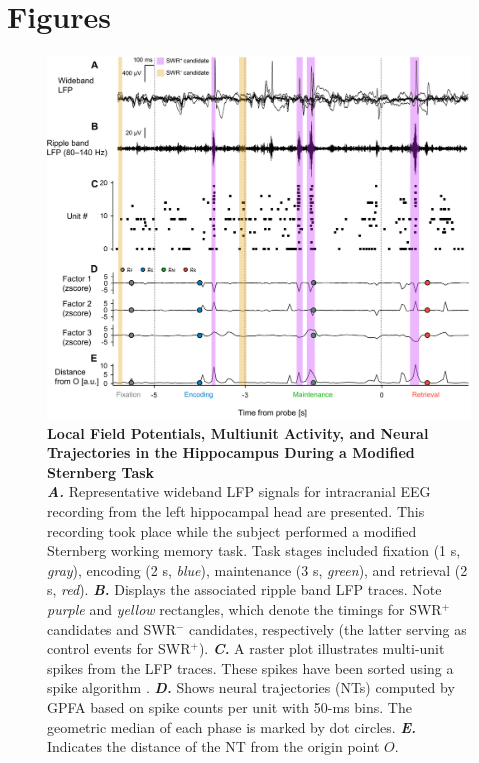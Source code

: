 \documentclass[preprint,review,12pt]{elsarticle}%
\begin{document}
\section*{Figures}
\label{figures}
        \clearpage
        \begin{figure}[ht]
        	\centering
            \includegraphics[width=1\textwidth]{./src/figures/.png/Figure_ID_01.png}
        	\caption{\textbf{
Local Field Potentials, Multiunit Activity, and Neural Trajectories in the Hippocampus During a Modified Sternberg Task
}
\smallskip
\\
\textbf{\textit{A.}} Representative wideband LFP signals for intracranial EEG recording from the left hippocampal head are presented. This recording took place while the subject performed a modified Sternberg working memory task. Task stages included fixation (1 s, \textit{gray}), encoding (2 s, \textit{blue}), maintenance (3 s, \textit{green}), and retrieval (2 s, \textit{red}). \textbf{\textit{B.}} Displays the associated ripple band LFP traces. Note \textit{purple} and \textit{yellow} rectangles, which denote the timings for SWR$^+$ candidates and SWR$^-$ candidates, respectively (the latter serving as control events for SWR$^+$). \textbf{\textit{C.}} A raster plot illustrates multi-unit spikes from the LFP traces. These spikes have been sorted using a spike algorithm \cite{niediek_reliable_2016}. \textbf{\textit{D.}} Shows neural trajectories (NTs) computed by GPFA\cite{yu_gaussian-process_2009} based on spike counts per unit with 50-ms bins. The geometric median of each phase is marked by dot circles. \textbf{\textit{E.}} Indicates the distance of the NT from the origin point $O$.
}
        	\label{fig:01}
        \end{figure}
\end{document}
